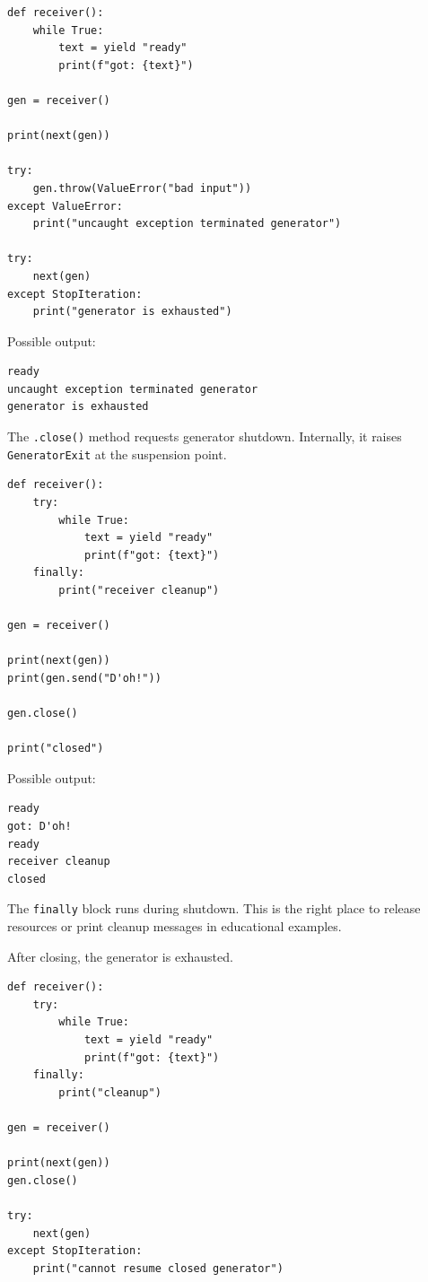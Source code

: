\begin{verbatim}
def receiver():
    while True:
        text = yield "ready"
        print(f"got: {text}")

gen = receiver()

print(next(gen))

try:
    gen.throw(ValueError("bad input"))
except ValueError:
    print("uncaught exception terminated generator")

try:
    next(gen)
except StopIteration:
    print("generator is exhausted")
\end{verbatim}

Possible output:

\begin{verbatim}
ready
uncaught exception terminated generator
generator is exhausted
\end{verbatim}

The \texttt{.close()} method requests generator shutdown. Internally, it raises \texttt{GeneratorExit} at the suspension point.

\begin{verbatim}
def receiver():
    try:
        while True:
            text = yield "ready"
            print(f"got: {text}")
    finally:
        print("receiver cleanup")

gen = receiver()

print(next(gen))
print(gen.send("D'oh!"))

gen.close()

print("closed")
\end{verbatim}

Possible output:

\begin{verbatim}
ready
got: D'oh!
ready
receiver cleanup
closed
\end{verbatim}

The \texttt{finally} block runs during shutdown. This is the right place to release resources or print cleanup messages in educational examples.

After closing, the generator is exhausted.

\begin{verbatim}
def receiver():
    try:
        while True:
            text = yield "ready"
            print(f"got: {text}")
    finally:
        print("cleanup")

gen = receiver()

print(next(gen))
gen.close()

try:
    next(gen)
except StopIteration:
    print("cannot resume closed generator")
\end{verbatim}

